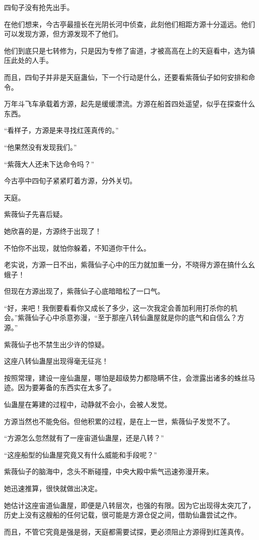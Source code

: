 \begin{this_body}
四旬子没有抢先出手。

在他们想来，今古亭最擅长在光阴长河中侦查，此刻他们相距方源十分遥远。他们可以发现方源，但方源发现不了他们。

他们到底只是七转修为，只是因为专修了宙道，才被高高在上的天庭看中，选为镇压此处的人手。

而且，四旬子并非是天庭蛊仙，下一个行动是什么，还要看紫薇仙子如何安排和命令。

万年斗飞车承载着方源，起先是缓缓漂流。方源在船首四处遥望，似乎在探查什么东西。

“看样子，方源是来寻找红莲真传的。”

“他果然没有发现我们。”

“紫薇大人还未下达命令吗？”

今古亭中四旬子紧紧盯着方源，分外关切。

天庭。

紫薇仙子先喜后疑。

她欣喜的是，方源终于出现了！

不怕你不出现，就怕你躲着，不知道你干什么。

老实说，方源一日不出，紫薇仙子心中的压力就加重一分，不晓得方源在搞什么幺蛾子！

但现在方源出现了，紫薇仙子心底暗暗松了一口气。

“好，来吧！我倒要看看你又成长了多少，这一次我定会善加利用打杀你的机会。”紫薇仙子心中杀意弥漫，“至于那座八转仙蛊屋就是你的底气和自信么？方源。”

紫薇仙子也不禁生出少许的惊疑。

这座八转仙蛊屋出现得毫无征兆！

按照常理，建设一座仙蛊屋，哪怕是超级势力都隐瞒不住，会泄露出诸多的蛛丝马迹。因为要筹备的东西实在太多了。

仙蛊屋在筹建的过程中，动静就不会小，会被人发觉。

方源当然也不能免俗。但他积累的过程，是在上一世，紫薇仙子发觉不了。

“方源怎么忽然就有了一座宙道仙蛊屋，还是八转？”

“这座船型的仙蛊屋究竟又有什么威能和手段呢？”

紫薇仙子的脑海中，念头不断碰撞，中央大殿中紫气迅速弥漫开来。

她迅速推算，很快就做出决定。

她估计这座宙道仙蛊屋，即便是八转层次，也强的有限。因为它出现得太突兀了，历史上没有这艘船的任何记载，很可能是方源仓促之间，借助仙蛊尝试之作。

而且，不管它究竟是强是弱，天庭都需要试探，更必须阻止方源得到红莲真传。


\end{this_body}
